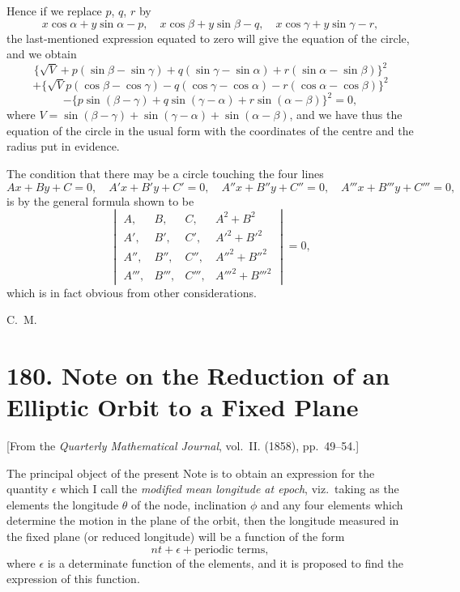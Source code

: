 \documentclass[12pt,a4paper]{article}
\theoremstyle{plain}
\theoremstyle{definition}
\begin{document}
Hence if we replace $p$, $q$, $r$ by
\[
x\cos\alpha + y\sin\alpha - p, \quad x\cos\beta + y\sin\beta - q, \quad x\cos\gamma + y\sin\gamma - r,
\]
the last-mentioned expression equated to zero will give the equation of the circle, and we obtain
\[
\{\sqrt{V} + p(\sin\beta - \sin\gamma) + q(\sin\gamma - \sin\alpha) + r(\sin\alpha - \sin\beta)\}^2
\]
\[
+ \{\sqrt{V}p(\cos\beta - \cos\gamma) - q(\cos\gamma - \cos\alpha) - r(\cos\alpha - \cos\beta)\}^2
\]
\[
- \{p\sin(\beta - \gamma) + q\sin(\gamma - \alpha) + r\sin(\alpha - \beta)\}^2 = 0,
\]
where $V = \sin(\beta - \gamma) + \sin(\gamma - \alpha) + \sin(\alpha - \beta)$, and we have thus the equation of the circle in the usual form with the coordinates of the centre and the radius put in evidence.

The condition that there may be a circle touching the four lines
\[
Ax + By + C = 0, \quad A'x + B'y + C' = 0, \quad A''x + B''y + C'' = 0, \quad A'''x + B'''y + C''' = 0,
\]
is by the general formula shown to be
\[
\begin{vmatrix}
A, & B, & C, & A^2 + B^2 \\
A', & B', & C', & A'^2 + B'^2 \\
A'', & B'', & C'', & A''^2 + B''^2 \\
A''', & B''', & C''', & A'''^2 + B'''^2
\end{vmatrix} = 0,
\]
which is in fact obvious from other considerations.

\begin{flushright}
C.~M.
\end{flushright}


\newpage
\section*{180. Note on the Reduction of an Elliptic Orbit to a Fixed Plane}

[From the \textit{Quarterly Mathematical Journal}, vol.~II. (1858), pp.~49--54.]

The principal object of the present Note is to obtain an expression for the quantity $\epsilon$ which I call the \textit{modified mean longitude at epoch}, viz.\ taking as the elements the longitude $\theta$ of the node, inclination $\phi$ and any four elements which determine the motion in the plane of the orbit, then the longitude measured in the fixed plane (or reduced longitude) will be a function of the form
\[
nt + \epsilon + \text{periodic terms},
\]
where $\epsilon$ is a determinate function of the elements, and it is proposed to find the expression of this function.
\end{document}
